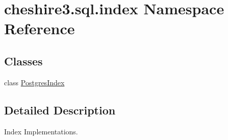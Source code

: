 \hypertarget{namespacecheshire3_1_1sql_1_1index}{\section{cheshire3.\-sql.\-index Namespace Reference}
\label{namespacecheshire3_1_1sql_1_1index}
}
\subsection*{Classes}
\begin{DoxyCompactItemize}
\item 
class \hyperlink{classcheshire3_1_1sql_1_1index_1_1_postgres_index}{Postgres\-Index}
\end{DoxyCompactItemize}


\subsection{Detailed Description}
\begin{DoxyVerb}Index Implementations.\end{DoxyVerb}
 